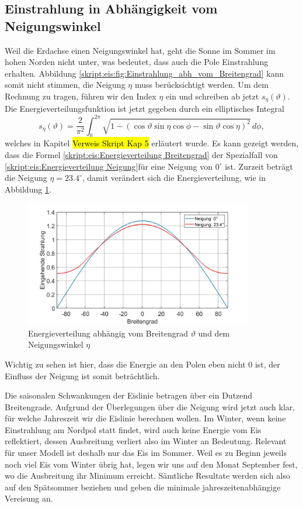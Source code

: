 \begin{refsection}
\subsection{Einstrahlung in Abhängigkeit vom Neigungswinkel}
Weil die Erdachse einen Neigungswinkel hat, geht die Sonne im Sommer im hohen Norden nicht unter, was bedeutet, dass auch die Pole Einstrahlung erhalten. Abbildung \ref{skript:eis:fig:Einstrahlung_abh_vom_Breitengrad} kann somit nicht stimmen, die Neigung $\eta$ muss berücksichtigt werden. Um dem Rechnung zu tragen, führen wir den Index $\eta$ ein und schreiben ab jetzt $s_{\eta}(\vartheta)$. Die Energieverteilungsfunktion ist jetzt gegeben durch ein elliptisches Integral
\begin{equation}\label{skript:eis:Energieverteilung Neigung}
s_{\eta}(\vartheta)
=
\frac{2}{\pi^2}\int_{0}^{2\pi}\sqrt{1-(\cos\vartheta\sin\eta \cos\phi-\sin\vartheta \cos\eta)^2}\,d\phi,
\end{equation}
welches in Kapitel \hl{Verweis Skript Kap 5} erläutert wurde. Es kann gezeigt werden, dass die Formel \eqref{skript:eis:Energieverteilung Breitengrad} der Spezialfall von \eqref{skript:eis:Energieverteilung Neigung}für eine Neigung von $0^{\circ}$ ist. Zurzeit beträgt die Neigung $\eta=23.4^{\circ}$, damit verändert sich die Energieverteilung, wie in Abbildung \ref{skript:eis:fig:Einstrahlung_abh_mit_und_ohne_Neigung}.
\begin{figure}
	\centering
	\includegraphics[width=10cm]{eis/Einstrahlung_abh_mit_und_ohne_Neigung.jpg}
	\caption{Energieverteilung abhängig vom Breitengrad $\vartheta$ und dem Neigungswinkel $\eta$}
	\label{skript:eis:fig:Einstrahlung_abh_mit_und_ohne_Neigung}
\end{figure}
Wichtig zu sehen ist hier, dass die Energie an den Polen eben nicht $0$ ist, der Einfluss der Neigung ist somit beträchtlich.

Die saisonalen Schwankungen der Eislinie betragen über ein Dutzend Breitengrade. Aufgrund der Überlegungen über die Neigung wird jetzt auch klar, für welche Jahreszeit wir die Eislinie berechnen wollen. Im Winter, wenn keine Einstrahlung am Nordpol statt findet, wird auch keine Energie vom Eis reflektiert, dessen Ausbreitung verliert also im Winter an Bedeutung. Relevant für unser Modell ist deshalb nur das Eis im Sommer. Weil es zu Beginn jeweils noch viel Eis vom Winter übrig hat, legen wir uns auf den Monat September fest, wo die Ausbreitung ihr Minimum erreicht. Sämtliche Resultate werden sich also auf den Spätsommer beziehen und geben die minimale jahreszeitenabhängige Vereisung an.

\end{refsection}
